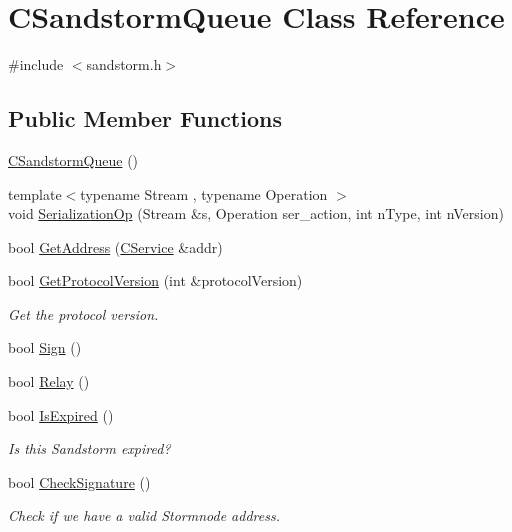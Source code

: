 \hypertarget{class_c_sandstorm_queue}{}\section{C\+Sandstorm\+Queue Class Reference}
\label{class_c_sandstorm_queue}


{\ttfamily \#include $<$sandstorm.\+h$>$}

\subsection*{Public Member Functions}
\begin{DoxyCompactItemize}
\item 
\hyperlink{class_c_sandstorm_queue_ab5252e860c7a8050dbd44d32b892f131}{C\+Sandstorm\+Queue} ()
\item 
{\footnotesize template$<$typename Stream , typename Operation $>$ }\\void \hyperlink{class_c_sandstorm_queue_a9179d7339eb373473bc79c2ac1eb5e9e}{Serialization\+Op} (Stream \&s, Operation ser\+\_\+action, int n\+Type, int n\+Version)
\item 
bool \hyperlink{class_c_sandstorm_queue_a0e1739e9a0c517f0de35807c92db1256}{Get\+Address} (\hyperlink{class_c_service}{C\+Service} \&addr)
\item 
bool \hyperlink{class_c_sandstorm_queue_acaa6374baeb707ed1726ec60c67c1624}{Get\+Protocol\+Version} (int \&protocol\+Version)
\begin{DoxyCompactList}\small\item\em Get the protocol version. \end{DoxyCompactList}\item 
bool \hyperlink{class_c_sandstorm_queue_a7a9c9b05136c8dfe75d9c1d4c81df83b}{Sign} ()
\item 
bool \hyperlink{class_c_sandstorm_queue_af5d648df81c6159c92f20d88af3974d3}{Relay} ()
\item 
bool \hyperlink{class_c_sandstorm_queue_a2b509d89f0a6c0d858a5e28bab2e2017}{Is\+Expired} ()
\begin{DoxyCompactList}\small\item\em Is this Sandstorm expired? \end{DoxyCompactList}\item 
bool \hyperlink{class_c_sandstorm_queue_a8ef2f37969599d3b30bbe479eff56460}{Check\+Signature} ()
\begin{DoxyCompactList}\small\item\em Check if we have a valid Stormnode address. \end{DoxyCompactList}\end{DoxyCompactItemize}
